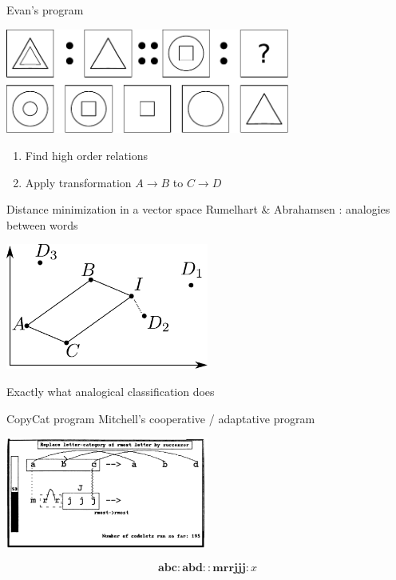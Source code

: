 \documentclass{beamer}
\begin{document}

\begin{frame}{Evan's program \cite{Eva64}}
  \begin{center}
  \includegraphics[width=0.7\textwidth]{figures/evans.pdf}
  \end{center}
  \begin{enumerate}
    \item Find high order relations
    \item Apply transformation $A \rightarrow B$ to $C \rightarrow D$
  \end{enumerate}
\end{frame}

\begin{frame}{Distance minimization in a vector space}
  Rumelhart \& Abrahamsen \cite{RumAbr73}: analogies between words
  \begin{center}
  \includegraphics[width=0.5\textwidth]{figures/rumelhart_model.pdf}
  \end{center}
  \alert{Exactly} what analogical classification does
\end{frame}

\begin{frame}{CopyCat program}
  Mitchell's cooperative / adaptative program \cite{Mit93}
  \begin{center}
  \includegraphics[width=0.5\textwidth]{figures/copycat.png}
  \end{center}
  $$\mathbf{abc} : \mathbf{abd} :: \mathbf{mrrjjj} : x$$
\end{frame}
\end{document}

